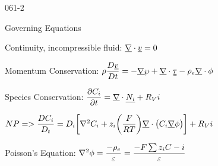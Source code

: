 \begin{mitframe}{061-2}
\begin{listone}
	\item Governing Equations
	\begin{listtwo}
	\item Continuity, incompressible fluid: $\gradop\cdot\uline{\vvel}=0$
    \item Momentum Conservation: $\dens\dfrac{\elecdisplace\uline{\vvel}}{\elecdisplace{t}}=-\gradop\dynpress+\gradop\cdot\uuline{\torque}-\dens_{\e}\gradop\cdot\eleccoeff$
    	\item Species Conservation: $\dfrac{\partial\conc_{\state}}{\partial{t}}=\gradop\cdot\uline{\massspecflux{i}}+\specsource{i}$
        		\begin{listthree}
                		\item $\nummoles\p=>\dfrac{\elecdisplace\conc_{\state}}{\elecdisplace_{t}}=\pdiff\bigg[\nabla^2\conc_{\state}+{z}_{\state}\bigg(\dfrac{\force}{\gasconst\Temp}\bigg)\gradop\cdot\big(\conc_{\state}\gradop\eleccoeff\big)\bigg]+\specsource{i}$
                \end{listthree} 
             \item Poisson's Equation: $\nabla^2\eleccoeff=\dfrac{-\dens_{\e}}{\varepsilon}=\dfrac{-\force\sum\nolimits{z}_{\state}\conc-{\state}}{\varepsilon}$
      \end{listtwo}          
                
\end{listone}
\end{mitframe}